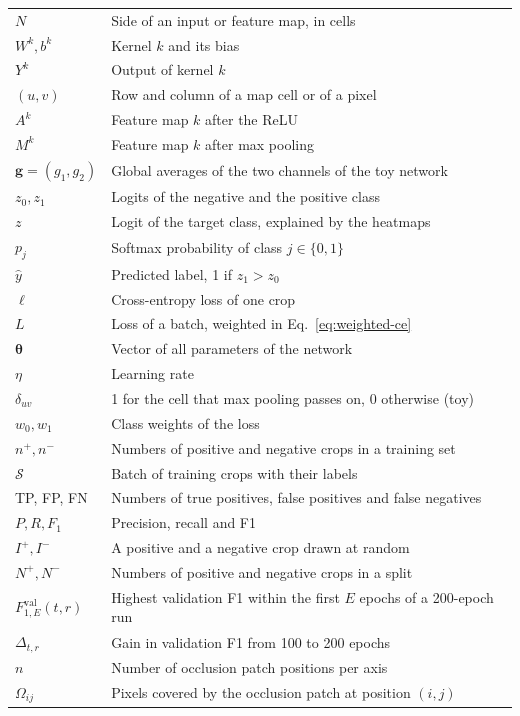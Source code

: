 \begin{longtable}{@{}p{}p{}@{}}
$N$ & Side of an input or feature map, in cells \\
$W^k, b^k$ & Kernel $k$ and its bias \\
$Y^k$ & Output of kernel $k$ \\
$(u, v)$ & Row and column of a map cell or of a pixel \\
$A^k$ & Feature map $k$ after the ReLU \\
$M^k$ & Feature map $k$ after max pooling \\
$\bm{g} = (g_1, g_2)$ & Global averages of the two channels of the toy network \\
$z_0, z_1$ & Logits of the negative and the positive class \\
$z$ & Logit of the target class, explained by the heatmaps \\
$p_j$ & Softmax probability of class $j \in \{0, 1\}$ \\
$\hat{y}$ & Predicted label, 1 if $z_1 > z_0$ \\
$\ell$ & Cross-entropy loss of one crop \\
$L$ & Loss of a batch, weighted in Eq.~\eqref{eq:weighted-ce} \\
$\bm{\theta}$ & Vector of all parameters of the network \\
$\eta$ & Learning rate \\
$\delta_{uv}$ & 1 for the cell that max pooling passes on, 0 otherwise (toy) \\
$w_0, w_1$ & Class weights of the loss \\
$n^+, n^-$ & Numbers of positive and negative crops in a training set \\
$\mathcal{S}$ & Batch of training crops with their labels \\
TP, FP, FN & Numbers of true positives, false positives and false negatives \\
$P, R, F_1$ & Precision, recall and F1 \\
$I^+, I^-$ & A positive and a negative crop drawn at random \\
$N^+, N^-$ & Numbers of positive and negative crops in a split \\
$F_{1,E}^{\mathrm{val}}(t, r)$ & Highest validation F1 within the first $E$ epochs of a 200-epoch run \\
$\Delta_{t,r}$ & Gain in validation F1 from 100 to 200 epochs \\
$n$ & Number of occlusion patch positions per axis \\
$\Omega_{ij}$ & Pixels covered by the occlusion patch at position $(i, j)$ \\

\end{longtable}
